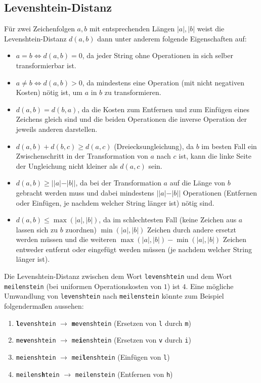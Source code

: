 \documentclass{whswinvcbook}
\begin{document}
\subsection{Levenshtein-Distanz}
Für zwei Zeichenfolgen $a,b$ mit entsprechenden Längen $|a|,|b|$ weist die Levenshtein-Distanz $d(a,b)$ dann unter anderem folgende Eigenschaften auf:
\begin{itemize}
    \item $a=b\Longleftrightarrow d(a,b)=0$, da jeder String ohne Operationen in sich selber transformierbar ist.
    \item $a\neq b\Longleftrightarrow d(a,b)>0$, da mindestens eine Operation (mit nicht negativen Kosten) nötig ist, um $a$ in $b$ zu transformieren.
    \item $d(a,b)=d(b,a)$, da die Kosten zum Entfernen und zum Einfügen eines Zeichens gleich sind und die beiden Operationen die inverse Operation der jeweils anderen darstellen.
    \item $d(a,b)+d(b,c)\geq d(a,c)$ (Dreiecksungleichung), da $b$ im besten Fall ein Zwischenschritt in der Transformation von $a$ nach $c$ ist, kann die linke Seite der Ungleichung nicht kleiner als $d(a,c)$ sein.
    \item $d(a,b)\geq||a|-|b||$, da bei der Transformation $a$ auf die Länge von $b$ gebracht werden muss und dabei mindestens $||a|-|b||$ Operationen (Entfernen oder Einfügen, je nachdem welcher String länger ist) nötig sind.
    \item $d(a,b)\leq \max(|a|,|b|)$, da im schlechtesten Fall (keine Zeichen aus $a$ lassen sich zu $b$ zuordnen) $\min(|a|,|b|)$ Zeichen durch andere ersetzt werden müssen und die weiteren $\max(|a|,|b|)-\min(|a|,|b|)$ Zeichen entweder entfernt oder eingefügt werden müssen (je nachdem welcher String länger ist).
\end{itemize}
Die Levenshtein-Distanz zwischen dem Wort \texttt{levenshtein} und dem Wort \texttt{meilenstein} (bei uniformen Operationskosten von $1$) ist $4$. Eine mögliche Umwandlung von \texttt{levenshtein} nach \texttt{meilenstein} könnte zum Beispiel folgendermaßen aussehen:
\begin{enumerate}
    \item \texttt{\textbf{l}evenshtein} $\rightarrow$ \texttt{\textbf{m}evenshtein} (Ersetzen von \texttt{l} durch \texttt{m})
    \item \texttt{me\textbf{v}enshtein} $\rightarrow$ \texttt{me\textbf{i}enshtein} (Ersetzen von \texttt{v} durch \texttt{i})
    \item \texttt{meienshtein} $\rightarrow$ \texttt{mei\textbf{l}enshtein} (Einfügen von \texttt{l})
    \item \texttt{meilens\textbf{h}tein} $\rightarrow$ \texttt{meilenstein} (Entfernen von \texttt{h})
\end{enumerate}
\end{document}
